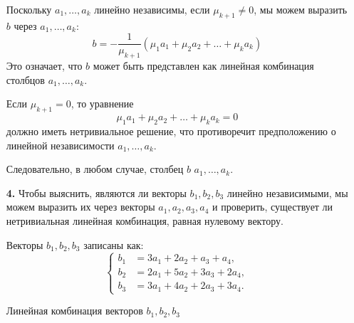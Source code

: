 \documentclass[a4paper]{article}
\newcommand{\case}[1]{\begin{cases} #1 \end{cases}}
\begin{document}
\begin{enumerate}
    Поскольку $ a_{1}, \ldots, a_{k} $ линейно независимы, если $ \mu_{k+1} \neq 0 $, мы можем выразить $ b $ через $ a_{1}, \ldots, a_{k} $:
    $$
    b = -\frac{1}{\mu_{k+1}} (\mu_1 a_1 + \mu_2 a_2 + \ldots + \mu_k a_k)
    $$
    Это означает, что $ b $ может быть представлен как линейная комбинация столбцов $ a_{1}, \ldots, a_{k} $.

    Если $ \mu_{k+1} = 0 $, то уравнение
    $$
    \mu_1 a_1 + \mu_2 a_2 + \ldots + \mu_k a_k = 0
    $$
    должно иметь нетривиальное решение, что противоречит предположению о линейной независимости $ a_{1}, \ldots, a_{k} $.

    
    Следовательно, в любом случае, столбец $ b $   $ a_{1}, \ldots, a_{k} $. \\

    \item[\textbf{4.}]Чтобы выяснить, являются ли векторы $ b_{1}, b_{2}, b_{3} $ линейно независимыми, мы можем выразить их через векторы $ a_{1}, a_{2}, a_{3}, a_{4} $ и проверить, существует ли нетривиальная линейная комбинация, равная нулевому вектору.

    Векторы $ b_{1}, b_{2}, b_{3} $ записаны как:
    $$
    \case{
    b_{1} &= 3 a_{1} + 2 a_{2} + a_{3} + a_{4}, \\
    b_{2} &= 2 a_{1} + 5 a_{2} + 3 a_{3} + 2 a_{4}, \\
    b_{3} &= 3 a_{1} + 4 a_{2} + 2 a_{3} + 3 a_{4}.
    }
    $$

    Линейная комбинация векторов $ b_{1}, b_{2}, b_{3} $


\end{enumerate}
\end{document}
